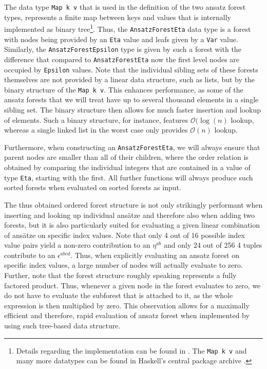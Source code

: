 The data type \texttt{Map k v} that is used in the definition of the two ansatz forest types, represents a finite map between keys and values that is internally implemented as binary tree\footnote{Details regarding the implementation can be found in \cite{adams_1993}. The \texttt{Map k v} \cite{HackageMap} and many more datatypes can be found in Haskell's central package archive \cite{Hackage}.}. Thus, the \texttt{AnsatzForestEta} data type is a forest with nodes being provided by an \texttt{Eta} value and leafs given by a \texttt{Var} value. Similarly, the \texttt{AnsatzForestEpsilon} type is given by such a forest with the difference that compared to \texttt{AnsatzForestEta} now the first level nodes are occupied by \texttt{Epsilon} values. Note that the individual sibling sets of these forests themselves are not provided by a linear data structure, such as lists, but by the binary structure of the \texttt{Map k v}. This enhances performance, as some of the ansatz forests that we will treat have up to several thousand elements in a single sibling set. The binary structure then allows for much faster insertion and lookup of elements. Such a binary structure, for instance, features $\mathcal{O}(\operatorname{log}(n)$ lookup, whereas a single linked list in the worst case only provides $\mathcal{O}(n)$ lookup. 

Furthermore, when constructing an \texttt{AnsatzForestEta}, we will always ensure that parent nodes are smaller than all of their children, where the order relation is obtained by comparing the individual integers that are contained in a value of type \texttt{Eta}, starting with the first. All further functions will always produce such sorted forests when evaluated on sorted forests as input. 

The thus obtained ordered forest structure is not only strikingly performant when inserting and looking up individual ansätze and therefore also when adding two forests, but it is also particularly suited for evaluating a given linear combination of ansätze on specific index values. Note that only 4 out of 16 possible index value pairs yield a non-zero contribution to an $\eta^{ab}$ and only 24 out of 256 4 tuples contribute to an $\epsilon^{abcd}$. Thus, when explicitly evaluating an ansatz forest on specific index values, a large number of nodes will actually evaluate to zero. Further, note that the forest structure roughly speaking represents a fully factored product. Thus, whenever a given node in the forest evaluates to zero, we do not have to evaluate the subforest that is attached to it, as the whole expression is then multiplied by zero. This observation allows for a maximally efficient and therefore, rapid evaluation of ansatz forest when implemented by using such tree-based data structure. 

